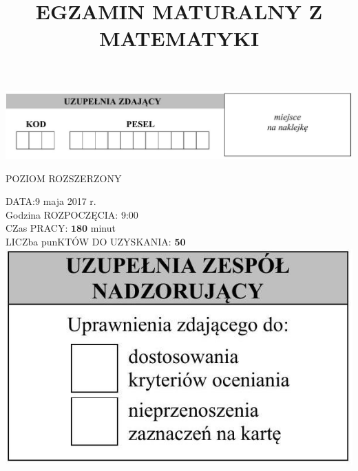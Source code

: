 \documentclass[10pt]{article}
\title{EGZAMIN MATURALNY Z MATEMATYKI }
\author{}
\date{}
\begin{document}
\maketitle
\begin{center}
\includegraphics[max width=\textwidth]{2024_11_21_3120cbc7edd07b3a101fg-01(1)}
\end{center}

POZIOM ROZSZERZONY

DATA:9 maja 2017 r.\\
Godzina ROZPOCZĘCIA: 9:00\\
CZas PRACY: \(\mathbf{1 8 0}\) minut\\
LICZba punKTÓW DO UZYSKANIA: \(\mathbf{5 0}\)\\
\includegraphics[max width=\textwidth, center]{2024_11_21_3120cbc7edd07b3a101fg-01(3)}
\end{document}
